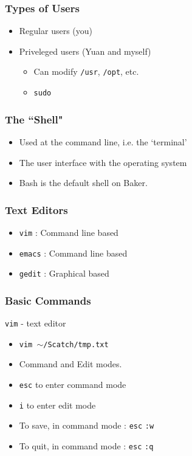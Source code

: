 \documentclass{beamer}
\newcommand{\code}[1]{\colorbox{codegray}{\texttt{#1}}}
\begin{document}
\begin{frame}
\frametitle{Types of Users}
\begin{itemize}
    \item Regular users (you)
    \bigskip
    \pause

    \item Priveleged users (Yuan and myself)
    \bigskip
    \pause

    \begin{itemize}
        \item Can modify \code{/usr}, \code{/opt}, etc.
        \bigskip
        \pause

        \item \code{sudo}
    \end{itemize}
\end{itemize}
\end{frame}


\begin{frame}
\frametitle{The ``Shell"}
    \begin{itemize}
        \item Used at the command line, i.e. the `terminal'
        \pause
        \bigskip
        \item The user interface with the operating system
        \pause
        \bigskip
        \item Bash is the default shell on Baker.
    \end{itemize}
\end{frame}


\begin{frame}
\frametitle{Text Editors}
\begin{itemize}
    \item \code{vim}   : Command line based
    \pause
    \bigskip
    \item \code{emacs} : Command line based
    \pause
    \bigskip
    \item \code{gedit} : Graphical  based
\end{itemize}
\end{frame}


\begin{frame}
\frametitle{Basic Commands}
\code{vim} - text editor
\bigskip
\begin{itemize}
    \item \code{vim $\sim$/Scatch/tmp.txt}
    \bigskip
    \pause
    \item Command and Edit modes.
    \bigskip
    \pause
    \item \code{esc} to enter command mode
    \pause
    \bigskip
    \item \code{i} to enter edit mode
    \pause
    \bigskip
    \item To save, in command mode : \code{esc} \code{:w}
    \pause
    \bigskip
    \item To quit, in command mode : \code{esc} \code{:q}
\end{itemize}
\end{frame}
\end{document}
